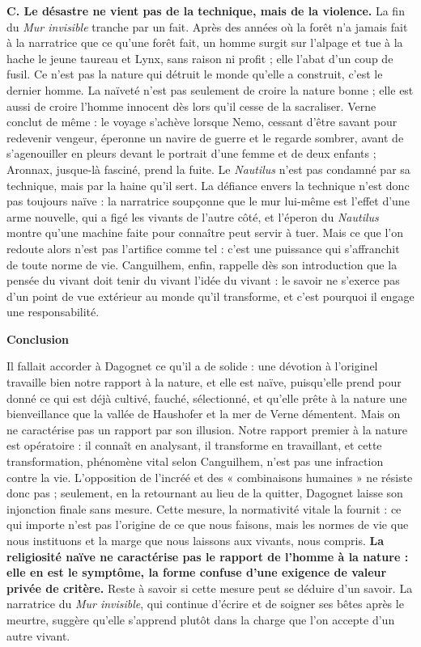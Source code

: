 \documentclass[11pt,a4paper]{article}
\begin{document}
\textbf{C. Le désastre ne vient pas de la technique, mais de la violence.} La fin du \emph{Mur invisible} tranche par un fait. Après des années où la forêt n'a jamais fait à la narratrice que ce qu'une forêt fait, un homme surgit sur l'alpage et tue à la hache le jeune taureau et Lynx, sans raison ni profit ; elle l'abat d'un coup de fusil. Ce n'est pas la nature qui détruit le monde qu'elle a construit, c'est le dernier homme. La naïveté n'est pas seulement de croire la nature bonne ; elle est aussi de croire l'homme innocent dès lors qu'il cesse de la sacraliser. Verne conclut de même : le voyage s'achève lorsque Nemo, cessant d'être savant pour redevenir vengeur, éperonne un navire de guerre et le regarde sombrer, avant de s'agenouiller en pleurs devant le portrait d'une femme et de deux enfants ; Aronnax, jusque-là fasciné, prend la fuite. Le \emph{Nautilus} n'est pas condamné par sa technique, mais par la haine qu'il sert. La défiance envers la technique n'est donc pas toujours naïve : la narratrice soupçonne que le mur lui-même est l'effet d'une arme nouvelle, qui a figé les vivants de l'autre côté, et l'éperon du \emph{Nautilus} montre qu'une machine faite pour connaître peut servir à tuer. Mais ce que l'on redoute alors n'est pas l'artifice comme tel : c'est une puissance qui s'affranchit de toute norme de vie. Canguilhem, enfin, rappelle dès son introduction que la pensée du vivant doit tenir du vivant l'idée du vivant : le savoir ne s'exerce pas d'un point de vue extérieur au monde qu'il transforme, et c'est pourquoi il engage une responsabilité.

\textbf{Conclusion}

Il fallait accorder à Dagognet ce qu'il a de solide : une dévotion à l'originel travaille bien notre rapport à la nature, et elle est naïve, puisqu'elle prend pour donné ce qui est déjà cultivé, fauché, sélectionné, et qu'elle prête à la nature une bienveillance que la vallée de Haushofer et la mer de Verne démentent. Mais on ne caractérise pas un rapport par son illusion. Notre rapport premier à la nature est opératoire : il connaît en analysant, il transforme en travaillant, et cette transformation, phénomène vital selon Canguilhem, n'est pas une infraction contre la vie. L'opposition de l'incréé et des « combinaisons humaines » ne résiste donc pas ; seulement, en la retournant au lieu de la quitter, Dagognet laisse son injonction finale sans mesure. Cette mesure, la normativité vitale la fournit : ce qui importe n'est pas l'origine de ce que nous faisons, mais les normes de vie que nous instituons et la marge que nous laissons aux vivants, nous compris. \textbf{La religiosité naïve ne caractérise pas le rapport de l'homme à la nature : elle en est le symptôme, la forme confuse d'une exigence de valeur privée de critère.} Reste à savoir si cette mesure peut se déduire d'un savoir. La narratrice du \emph{Mur invisible}, qui continue d'écrire et de soigner ses bêtes après le meurtre, suggère qu'elle s'apprend plutôt dans la charge que l'on accepte d'un autre vivant.
\end{document}
